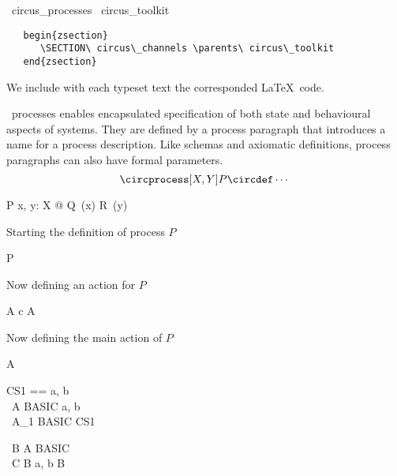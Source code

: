 \documentclass{article}
\begin{document}
\begin{zsection}
  \SECTION\ circus\_processes \parents\ circus\_toolkit
\end{zsection}
%
\begin{verbatim}
   begin{zsection}
      \SECTION\ circus\_channels \parents\ circus\_toolkit
   end{zsection}
\end{verbatim}
%
We include with each typeset text the corresponded \LaTeX\ code.

\Circus\ processes enables encapsulated specification of both state and
behavioural aspects of systems. They are defined by a process paragraph that
introduces a name for a process description. Like schemas and axiomatic
definitions, process paragraphs can also have formal parameters.
%
\[
   \circprocess [X, Y] P \circdef \cdots
\]

\begin{circusprocess}
    \begin{procheader}
        [X, Y] P \circdef x, y: X @ Q~(x) \extchoice R~(y)
    \end{procheader}
\end{circusprocess}

\begin{circusprocess}
    Starting the definition of process $P$
    \begin{procheader}
        [X, Y] P \circdef \circbegin
    \end{procheader}
    Now defining an action for $P$
    \begin{circusaction}
        A \circdef c \then A
    \end{circusaction}
    Now defining the main action of $P$
    \begin{mainaction}
        A
    \end{mainaction}
\end{circusprocess}


\begin{circus}
    \circchannelset CS1 == \lchanset a, b \rchanset \\ %
    \circprocess\ A \circdef BASIC \circhide \lchanset a, b \rchanset \\
    \circprocess\ A_1 \circdef BASIC \circhide CS1
\end{circus}

\begin{circus}
    \circprocess\ B \circdef A \interleave BASIC \\
    \circprocess\ C \circdef B \lpar \lchanset a, b \rchanset \rpar B
\end{circus}
\end{document}
